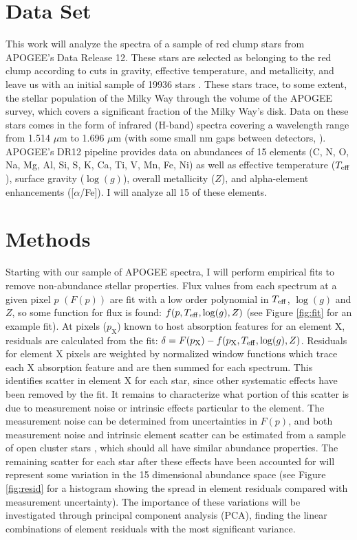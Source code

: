 \documentclass[preprint]{aastex}
\begin{document}
\section{Data Set}
\label{sec:data}
This work will analyze the spectra of a sample of red clump stars from APOGEE's Data Release 12. These stars are selected as belonging to the red clump according to cuts in gravity, effective temperature, and metallicity, and leave us with an initial sample of 19936 stars \citep{bovy2014}. These stars trace, to some extent, the stellar population of the Milky Way through the volume of the APOGEE survey, which covers a significant fraction of the Milky Way’s disk. Data on these stars comes in the form of infrared (H-band) spectra covering a wavelength range from 1.514 $\mu$m to 1.696 $\mu$m (with some small nm gaps between detectors, \citealt{APOGEE}). APOGEE's DR12 pipeline provides data on abundances of 15 elements (C, N, O, Na, Mg, Al, Si, S, K, Ca, Ti, V, Mn, Fe, Ni) as well as effective temperature ($T_{\rm eff}$), surface gravity ($\log(g)$), overall metallicity ($Z$), and alpha-element enhancements ([$\alpha$/Fe])\citep{holtzman2015}. I will analyze all 15 of these elements.

\section{Methods}
\label{sec:methods}
Starting with our sample of APOGEE spectra, I will perform empirical fits to remove non-abundance stellar properties. Flux values from each spectrum at a given pixel $p$ $(F(p))$ are fit with a low order polynomial in $T_{\rm eff}$, $\log(g)$ and $Z$, so some function for flux is found: $f(p,T_{\rm eff},\log(g),Z)$ (see Figure \ref{fig:fit} for an example fit). At pixels ($p_\mathrm{X}$) known to host absorption features for an element X, residuals are calculated from the fit: $\delta = F(p_\mathrm{X}) - f(p_\mathrm{X},T_{\rm eff},\log(g),Z)$. Residuals for element X pixels are weighted by normalized window functions which trace each X absorption feature and are then summed for each spectrum. This identifies scatter in element X for each star, since other systematic effects have been removed by the fit. It remains to characterize what portion of this scatter is due to measurement noise or intrinsic effects particular to the element. The measurement noise can be determined from uncertainties in $F(p)$, and both measurement noise and intrinsic element scatter can be estimated from a sample of open cluster stars \citep{meszaros2015}, which should all have similar abundance properties. The remaining scatter for each star after these effects have been accounted for will represent some variation in the 15 dimensional abundance space (see Figure \ref{fig:resid} for a histogram showing the spread in element residuals compared with measurement uncertainty). The importance of these variations will be investigated through principal component analysis (PCA), finding the linear combinations of element residuals with the most significant variance.
\end{document}
